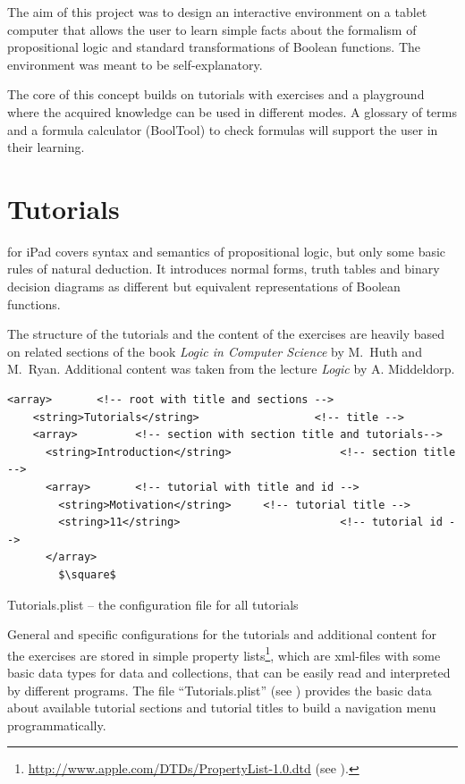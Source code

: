 
The aim of this project was to design an interactive environment on a tablet computer 
that allows the user to learn simple facts about the formalism of propositional logic 
and standard transformations of Boolean functions. 
The environment was meant to be self-explanatory. 

The core of this concept builds on tutorials with exercises 
and a playground where the %
acquired knowledge can be used in different modes. 
A glossary of terms and a formula calculator (BoolTool) to check formulas will support the user in their learning.

\section{Tutorials}

\Nyaya for iPad covers syntax and semantics of propositional logic, 
but only some basic rules of natural deduction. 
It introduces normal forms, truth tables and binary decision diagrams 
as different but equivalent representations of Boolean functions.

The structure of the tutorials and the content of the exercises are heavily based on %
related sections of the book  
{\em Logic in Computer Science} \cite{Huth:2004:LCS:975331} by M.~Huth and M.~Ryan.
Additional content was taken from the lecture {\em Logic} \cite{Middeldorp:2012:LICS} by {A. Middeldorp}.


\begin{table}[htdp]
\begin{center}
\begin{lstlisting}[mathescape,firstnumber=5]
  <array> 		<!-- root with title and sections -->
    <string>Tutorials</string> 					<!-- title -->
    <array>			<!-- section with section title and tutorials-->
      <string>Introduction</string> 				<!-- section title -->
      <array>		<!-- tutorial with title and id -->
        <string>Motivation</string> 	<!-- tutorial title -->
        <string>11</string> 						<!-- tutorial id -->
      </array>
		$\square$
\end{lstlisting}
\caption{Tutorials.plist – the configuration file for all tutorials}
\label{tab:TUTORIALPLIST}
\end{center}
\end{table}%

General and specific configurations for the tutorials and additional content for the exercises 
are stored in simple property lists\footnote{
\href{http://www.apple.com/DTDs/PropertyList-1.0.dtd}{http://www.apple.com/DTDs/PropertyList-1.0.dtd}
(see ). }, 
which are xml-files with some basic data types for data and collections, 
that can be easily read and interpreted by different programs.
The file “Tutorials.plist” (see ) 
provides the basic data about available tutorial sections and tutorial titles 
to build a navigation menu programmatically.


